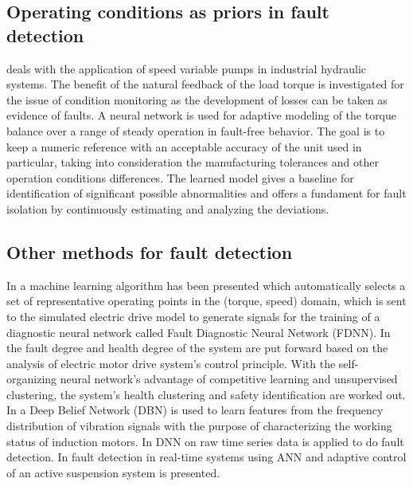 \documentclass[conference]{IEEEtran}
\begin{document}
\subsection{\textbf{Operating conditions as priors in fault detection}}

\cite{alicmotor} deals with the application of speed variable pumps in industrial hydraulic systems. The benefit of the natural feedback of the load torque is investigated for the issue of condition monitoring as the development of losses can be taken as evidence of faults. A neural network is used for adaptive modeling of the torque balance over a range of steady operation in fault-free behavior. The goal is to keep a numeric reference with an acceptable accuracy of the unit used in particular, taking into consideration the manufacturing tolerances and other operation conditions differences. The learned model gives a baseline for identification of significant possible abnormalities and offers a fundament for fault isolation by continuously estimating and analyzing the deviations.

\subsection{\textbf{Other methods for fault detection}}

In \cite{murphey2006fault, murphey2006model} a machine learning algorithm has been presented which automatically selects a set of representative operating points in the (torque, speed) domain, which is sent to the simulated electric drive model to generate signals for the training of a diagnostic neural network called Fault Diagnostic Neural Network (FDNN). In \cite{meng2016safety} the fault degree and health degree of the system are put forward based on the analysis of electric motor drive system’s control principle. With the self-organizing neural network’s advantage of competitive learning and unsupervised clustering, the system’s health clustering and safety identification are worked out. In \cite{Shao2017} a Deep Belief Network (DBN) is used to learn features from the frequency distribution of vibration signals with the purpose of characterizing the working status of induction motors. In \cite{zhang2017fault} DNN on raw time series data is applied to do fault detection. In \cite{marko1991nips} fault detection in real-time systems using ANN and adaptive control of an active suspension system is presented.




\end{document}
